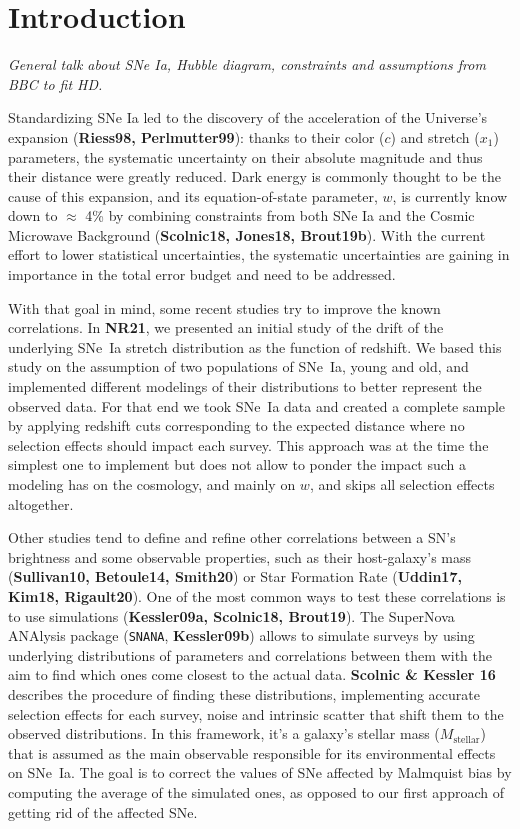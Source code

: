 \documentclass[]{aa}
\newcommand{\snana}{\texttt{SNANA}}
\begin{document}
\section{Introduction}
\textit{General talk about SNe Ia, Hubble diagram, constraints and assumptions
from BBC to fit HD.}

Standardizing SNe Ia led to the discovery of the acceleration of the Universe's
expansion (\textbf{Riess98, Perlmutter99}): thanks to their color ($c$) and
stretch ($x_1$) parameters, the systematic uncertainty on their absolute
magnitude and thus their distance were greatly reduced. Dark energy is commonly
thought to be the cause of this expansion, and its equation-of-state parameter,
$w$, is currently know down to $\approx$ 4\% by combining constraints from both
SNe Ia and the Cosmic Microwave Background (\textbf{Scolnic18, Jones18,
Brout19b}). With the current effort to lower statistical uncertainties, the
systematic uncertainties are gaining in importance in the total error budget and
need to be addressed.

With that goal in mind, some recent studies try to improve the known
correlations. In \textbf{NR21}, we presented an initial study of the drift of
the underlying SNe~Ia stretch distribution as the function of redshift. We based
this study on the assumption of two populations of SNe~Ia, young and old, and
implemented different modelings of their distributions to better represent the
observed data. For that end we took SNe~Ia data and created a complete sample by
applying redshift cuts corresponding to the expected distance where no selection
effects should impact each survey. This approach was at the time the simplest
one to implement but does not allow to ponder the impact such a modeling has on
the cosmology, and mainly on $w$, and skips all selection effects altogether.

Other studies tend to define and refine other correlations between a SN's
brightness and some observable properties, such as their host-galaxy's mass
(\textbf{Sullivan10, Betoule14, Smith20}) or Star Formation Rate
(\textbf{Uddin17, Kim18, Rigault20}). One of the most common ways to test these
correlations is to use simulations (\textbf{Kessler09a, Scolnic18, Brout19}).
The SuperNova ANAlysis package (\snana, \textbf{Kessler09b}) allows to simulate
surveys by using underlying distributions of parameters and correlations between
them with the aim to find which ones come closest to the actual data.
\textbf{Scolnic \& Kessler 16} describes the procedure of finding these
distributions, implementing accurate selection effects for each survey, noise
and intrinsic scatter that shift them to the observed distributions. In this
framework, it's a galaxy's stellar mass ($M_\mathrm{stellar}$) that is assumed
as the main observable responsible for its environmental effects on SNe~Ia. The
goal is to correct the values of SNe affected by Malmquist bias by computing the
average of the simulated ones, as opposed to our first approach of getting rid
of the affected SNe.
\end{document}
